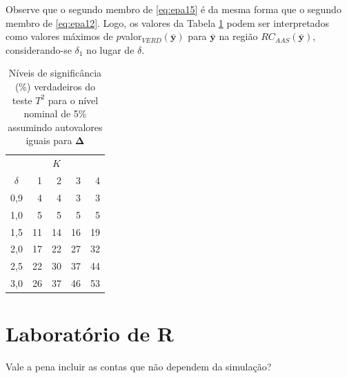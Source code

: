 \documentclass[]{book}
\numberwithin{example}{chapter}
\numberwithin{remark}{chapter}
\numberwithin{definition}{chapter}
\begin{document}
Observe que o segundo membro de \eqref{eq:epa15} é da mesma forma que o
segundo membro de \eqref{eq:epa12}. Logo, os valores da Tabela \ref{tab47}
podem ser interpretados como valores máximos de
\(p\)valor\(_{VERD}\left( \mathbf{\bar{y}}\right)\) para
\(\mathbf{\bar{y}}\) na região
\(RC_{AAS}\left(\mathbf{\bar{y}}\right)\), considerando-se
\(\delta_{1}\) no lugar de \(\delta\).

\begin{center}
\begin{table}[tbp] \centering
\caption{Níveis de significância (\%) verdadeiros do teste $T^{2}$
para o nível nominal de 5\% assumindo autovalores iguais 
para $\mathbf{\Delta}$}\bigskip \label{tab47}
\begin{tabular}{|c|cccc|}
\hline\hline
&  & $K$ &  &  \\ \cline{2-5}
$\delta $ & \multicolumn{1}{|r}{1} & \multicolumn{1}{r}{2} &
\multicolumn{1}{r}{3} & \multicolumn{1}{r|}{4} \\ \hline\hline
\multicolumn{1}{|r|}{0,9} & \multicolumn{1}{|r}{4} & \multicolumn{1}{r}{4} &
\multicolumn{1}{r}{3} & \multicolumn{1}{r|}{3} \\
\multicolumn{1}{|r|}{1,0} & \multicolumn{1}{|r}{5} & \multicolumn{1}{r}{5} &
\multicolumn{1}{r}{5} & \multicolumn{1}{r|}{5} \\
\multicolumn{1}{|r|}{1,5} & \multicolumn{1}{|r}{11} & \multicolumn{1}{r}{14}
& \multicolumn{1}{r}{16} & \multicolumn{1}{r|}{19} \\
\multicolumn{1}{|r|}{2,0} & \multicolumn{1}{|r}{17} & \multicolumn{1}{r}{22}
& \multicolumn{1}{r}{27} & \multicolumn{1}{r|}{32} \\
\multicolumn{1}{|r|}{2,5} & \multicolumn{1}{|r}{22} & \multicolumn{1}{r}{30}
& \multicolumn{1}{r}{37} & \multicolumn{1}{r|}{44} \\
\multicolumn{1}{|r|}{3,0} & \multicolumn{1}{|r}{26} & \multicolumn{1}{r}{37}
& \multicolumn{1}{r}{46} & \multicolumn{1}{r|}{53} \\ \hline\hline
\end{tabular}
\end{table}
\end{center}

\section{Laboratório de R}\label{laboratorio-de-r-1}

Vale a pena incluir as contas que não dependem da simulação?
\end{document}
